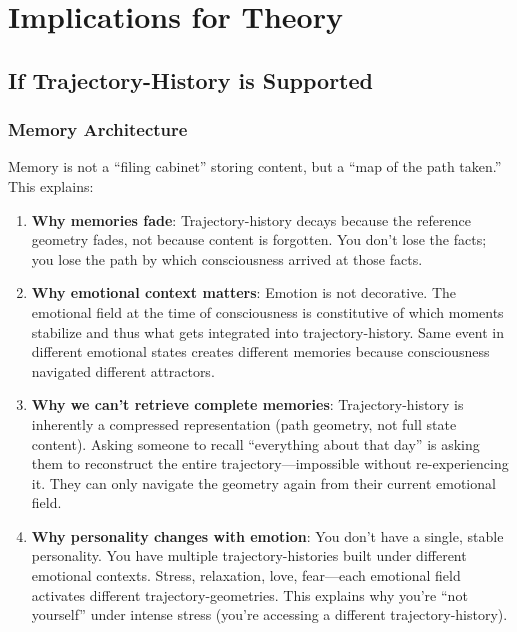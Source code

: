\documentclass[12pt,a4paper]{article}
\theoremstyle{definition}
\begin{document}
\section{Implications for Theory}

\subsection{If Trajectory-History is Supported}

\subsubsection{Memory Architecture}

Memory is not a ``filing cabinet'' storing content, but a ``map of the path taken.'' This explains:

\begin{enumerate}
  \item \textbf{Why memories fade}: Trajectory-history decays because the reference geometry fades, not because content is forgotten. You don't lose the facts; you lose the path by which consciousness arrived at those facts.

  \item \textbf{Why emotional context matters}: Emotion is not decorative. The emotional field at the time of consciousness is constitutive of which moments stabilize and thus what gets integrated into trajectory-history. Same event in different emotional states creates different memories because consciousness navigated different attractors.

  \item \textbf{Why we can't retrieve complete memories}: Trajectory-history is inherently a compressed representation (path geometry, not full state content). Asking someone to recall ``everything about that day'' is asking them to reconstruct the entire trajectory---impossible without re-experiencing it. They can only navigate the geometry again from their current emotional field.

  \item \textbf{Why personality changes with emotion}: You don't have a single, stable personality. You have multiple trajectory-histories built under different emotional contexts. Stress, relaxation, love, fear---each emotional field activates different trajectory-geometries. This explains why you're ``not yourself'' under intense stress (you're accessing a different trajectory-history).
\end{enumerate}
\end{document}
